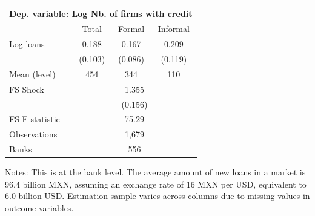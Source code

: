 \centering
\begin{threeparttable}
\begin{tabular}{lccc}
\toprule
\multicolumn{4}{c}{\textbf{Dep. variable}: Log Nb. of firms with credit} \\
\midrule
 & Total & Formal & Informal \\
\midrule
Log loans 
& 0.188  & 0.167  & 0.209 \\
& (0.103) & (0.086) & (0.119) \\
\midrule
Mean (level) & 454 & 344 & 110 \\
\midrule
FS Shock & \multicolumn{3}{c}{1.355} \\
& \multicolumn{3}{c}{(0.156)} \\
FS F-statistic & \multicolumn{3}{c}{75.29} \\
Observations & \multicolumn{3}{c}{1,679} \\
Banks & \multicolumn{3}{c}{556} \\
\bottomrule
\end{tabular}
\begin{tablenotes}[flushleft]
\tiny
\item Notes: This is at the bank level. The average amount of new loans in a market is 96.4 billion MXN, assuming an exchange rate of 16 MXN per USD, equivalent to 6.0 billion USD. Estimation sample varies across columns due to missing values in outcome variables.
\end{tablenotes}
\end{threeparttable}